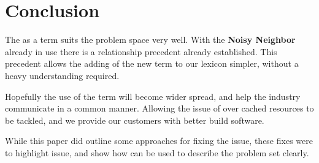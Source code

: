 
\section{Conclusion}
\label{sec:conclusion}

The \nn{} as a term suits the problem space very well.
With the \textbf{Noisy Neighbor} already in use there is a relationship precedent already established.
This precedent allows the adding of the new term to our lexicon simpler, without a heavy understanding required.

Hopefully the use of the term \nn{} will become wider spread, and help the industry communicate in a common manner.
Allowing the issue of over cached resources to be tackled, and we provide our customers with better build software.

While this paper did outline some approaches for fixing the issue, these fixes were to highlight issue, and show how \nn{} can be used to describe the problem set clearly.

